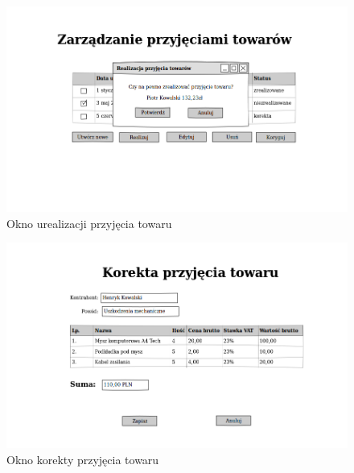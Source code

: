 \begin{figure}[!htb]
  \begin{center}
    \includegraphics[scale=0.45]{../img/interfejs/realizacja-przyjecia-towaru.png}
  \end{center}
  \caption{Okno urealizacji przyjęcia towaru}
\end{figure}
\FloatBarrier

\begin{figure}[!htb]
  \begin{center}
    \includegraphics[scale=0.45]{../img/interfejs/korekta-przyjecia-towaru.png}
  \end{center}
  \caption{Okno korekty przyjęcia towaru}
\end{figure}
\FloatBarrier